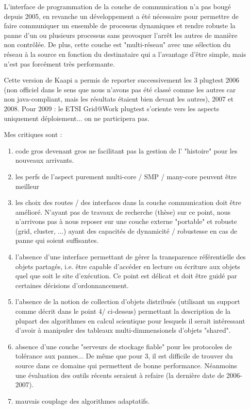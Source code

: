 \documentclass{report}
\begin{document}
L'interface de programmation de la couche de communication n'a pas bougé depuis 2005, en revanche un développement a été nécessaire pour permettre de faire communiquer un ensemble de processus dynamiques et rendre robuste la panne d'un ou plusieurs processus sans provoquer l'arrêt les autres de manière non contrôlée. De plus, cette couche est "multi-réseau" avec une sélection du réseau à la source en fonction du destinataire qui a l'avantage d'être simple, mais n'est pas forcément très performante.

Cette version de Kaapi a permis de reporter successivement les 3 plugtest 2006 (non officiel dans le sens que nous n'avons pas été classé comme les autres car non java-compliant, mais les résultats étaient bien devant les autres), 2007 et 2008.
Pour 2009 : le ETSI Grid@Work plugtest s'oriente vers les aspects uniquement déploiement... on ne participera pas.

Mes critiques sont :
\begin{enumerate}
\item code gros devenant gros ne facilitant pas la gestion de l' "histoire" pour les nouveaux arrivants.
\item les perfs de l'aspect purement multi-core / SMP / many-core peuvent être meilleur
\item les choix des routes / des interfaces dans la couche communication doit être amélioré. N'ayant pas de travaux de recherche (thèse) sur ce point, nous n'arrivons pas à nous reposer sur une couche externe "portable" et robuste (grid, cluster, ...) ayant des capacités de dynamicité / robustesse en cas de panne qui soient suffisantes.
\item l'absence d'une interface permettant de gérer la transparence référentielle des objets partagés, i.e. être capable d'accéder en lecture ou écriture aux objets quel que soit le site d'exécution. Ce point est délicat et doit être guidé par certaines décisions d'ordonnancement.
\item l'absence de la notion de collection d'objets distribués (utilisant un support comme décrit dans le point 4/ ci-dessus) permettant la description de la plupart des  algorithmes en calcul scientique pour lesquels il serait intéressant d'avoir à manipuler des tableaux multi-dimmensionels d'objets "shared".
\item absence d'une couche "serveurs de stockage fiable" pour les protocoles de tolérance aux pannes... De même que pour 3, il est difficile de trouver du source dans ce domaine qui permettent de bonne performance. Néanmoins une évaluation des outils récents seraient à refaire (la dernière date de 2006-2007).
\item mauvais couplage des algorithmes adaptatifs.
\end{enumerate}
\end{document}
